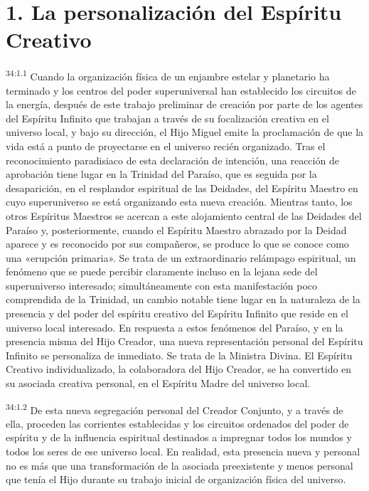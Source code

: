 \section*{1. La personalización del Espíritu Creativo}
\par
\textsuperscript{34:1.1} Cuando la organización física de un enjambre estelar y planetario ha terminado y los centros del poder superuniversal han establecido los circuitos de la energía, después de este trabajo preliminar de creación por parte de los agentes del Espíritu Infinito que trabajan a través de su focalización creativa en el universo local, y bajo su dirección, el Hijo Miguel emite la proclamación de que la vida está a punto de proyectarse en el universo recién organizado. Tras el reconocimiento paradisiaco de esta declaración de intención, una reacción de aprobación tiene lugar en la Trinidad del Paraíso, que es seguida por la desaparición, en el resplandor espiritual de las Deidades, del Espíritu Maestro en cuyo superuniverso se está organizando esta nueva creación. Mientras tanto, los otros Espíritus Maestros se acercan a este alojamiento central de las Deidades del Paraíso y, posteriormente, cuando el Espíritu Maestro abrazado por la Deidad aparece y es reconocido por sus compañeros, se produce lo que se conoce como una «erupción primaria». Se trata de un extraordinario relámpago espiritual, un fenómeno que se puede percibir claramente incluso en la lejana sede del superuniverso interesado; simultáneamente con esta manifestación poco comprendida de la Trinidad, un cambio notable tiene lugar en la naturaleza de la presencia y del poder del espíritu creativo del Espíritu Infinito que reside en el universo local interesado. En respuesta a estos fenómenos del Paraíso, y en la presencia misma del Hijo Creador, una nueva representación personal del Espíritu Infinito se personaliza de inmediato. Se trata de la Ministra Divina. El Espíritu Creativo individualizado, la colaboradora del Hijo Creador, se ha convertido en su asociada creativa personal, en el Espíritu Madre del universo local.

\par
\textsuperscript{34:1.2} De esta nueva segregación personal del Creador Conjunto, y a través de ella, proceden las corrientes establecidas y los circuitos ordenados del poder de espíritu y de la influencia espiritual destinados a impregnar todos los mundos y todos los seres de ese universo local. En realidad, esta presencia nueva y personal no es más que una transformación de la asociada preexistente y menos personal que tenía el Hijo durante su trabajo inicial de organización física del universo.

